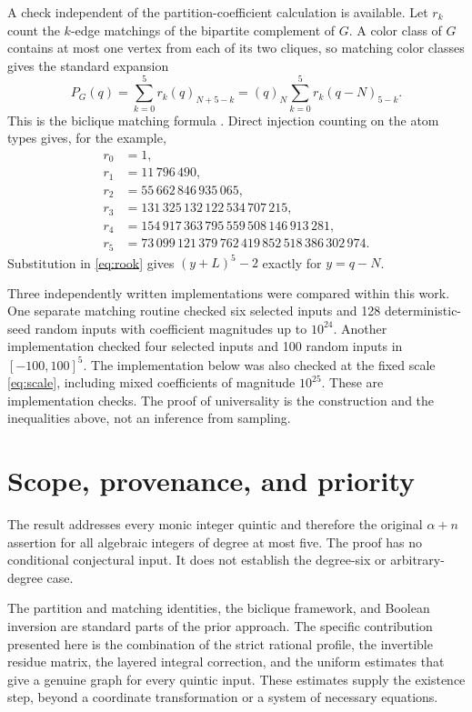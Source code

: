 \documentclass[11pt,a4paper]{article}
\theoremstyle{definition}
\newcommand{\fall}[2]{(#1)_{#2}}
\begin{document}
A check independent of the partition-coefficient calculation is available.
Let $r_k$ count the $k$-edge matchings of the bipartite complement of $G$.
A color class of $G$ contains at most one vertex from each of its two
cliques, so matching color classes gives the standard expansion
\begin{equation}\label{eq:rook}
 P_G(q)=\sum_{k=0}^5r_k\fall q{N+5-k}
       =\fall qN\sum_{k=0}^5r_k\fall{q-N}{5-k}.
\end{equation}
This is the biclique matching formula \cite[Section 2.1]{Bohn}.
Direct injection counting on the atom types gives, for the example,
\begin{align*}
 r_0&=1,\\
 r_1&=11\,796\,490,\\
 r_2&=55\,662\,846\,935\,065,\\
 r_3&=131\,325\,132\,122\,534\,707\,215,\\
 r_4&=154\,917\,363\,795\,559\,508\,146\,913\,281,\\
 r_5&=73\,099\,121\,379\,762\,419\,852\,518\,386\,302\,974.
\end{align*}
Substitution in \eqref{eq:rook} gives $(y+L)^5-2$ exactly for $y=q-N$.

Three independently written implementations were compared within this work.
One separate matching routine checked six selected inputs and 128
deterministic-seed random inputs with coefficient magnitudes up to $10^{24}$.
Another implementation checked four selected inputs and 100 random inputs
in $[-100,100]^5$. The implementation below was also checked at the fixed
scale \eqref{eq:scale}, including mixed coefficients of magnitude $10^{25}$.
These are implementation checks. The proof of universality is the
construction and the inequalities above, not an inference from sampling.

\section{Scope, provenance, and priority}\label{sec:scope}

The result addresses every monic integer quintic and therefore the original
$\alpha+n$ assertion for all algebraic integers of degree at most five.
The proof has no conditional conjectural input. It does not establish the
degree-six or arbitrary-degree case.

The partition and matching identities, the biclique framework, and Boolean
inversion are standard parts of the prior approach.
The specific contribution presented here is the combination of the strict
rational profile, the invertible residue matrix, the layered integral
correction, and the uniform estimates that give a genuine graph for every
quintic input. These estimates supply the existence step, beyond a
coordinate transformation or a system of necessary equations.
\end{document}
